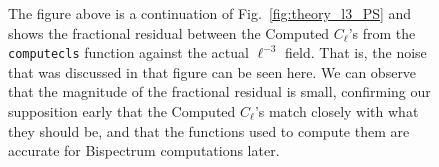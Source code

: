 \documentclass[11pt]{article}
\renewcommand{\_}[1]{\underline{ #1 }}
\newcommand{\us}{\textunderscore}
\begin{document}
{\begin{figure}[H]
    \centering
    \caption{The figure above is a continuation of Fig.~\ref{fig:theory_l3_PS} and shows the fractional residual between the Computed $C_{\ell}$'s from the \texttt{compute\us cls} function against the actual $\ell^{-3}$ field. That is, the noise that was discussed in that figure can be seen here. We can observe that the magnitude of the fractional residual is small, confirming our supposition early that the Computed $C_{\ell}$'s match closely with what they should be, and that the functions used to compute them are accurate for Bispectrum computations later.}\label{fig:residual_cl}
\end{figure}

}
\end{document}
